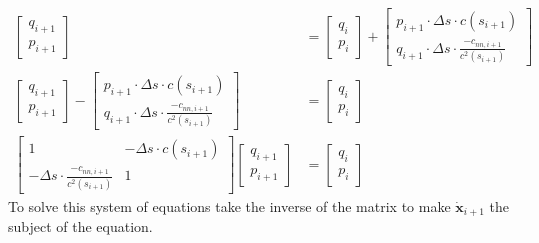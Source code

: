 \documentclass{article}
\begin{document}
\begin{align*}
	\begin{bmatrix} q_{i+1} \\ p_{i+1} \end{bmatrix}                                                                                                                                   & = \begin{bmatrix} q_{i} \\ p_{i} \end{bmatrix} + \begin{bmatrix} p_{i+1}\cdot\Delta s\cdot c(s_{i+1}) \\ q_{i+1}\cdot\Delta s\cdot\frac{-c_{nn,i+1}}{c^2(s_{i+1})} \end{bmatrix}              \\
	\begin{bmatrix} q_{i+1} \\ p_{i+1} \end{bmatrix} - \begin{bmatrix} p_{i+1}\cdot\Delta s\cdot c(s_{i+1}) \\ q_{i+1}\cdot\Delta s\cdot\frac{-c_{nn,i+1}}{c^2(s_{i+1})} \end{bmatrix} & = \begin{bmatrix} q_{i} \\ p_{i} \end{bmatrix}                                                                                                                                                \\
	\begin{bmatrix} 1 & -\Delta s\cdot c(s_{i+1}) \\ -\Delta s\cdot\frac{-c_{nn,i+1}}{c^2(s_{i+1})} & 1 \end{bmatrix} \begin{bmatrix}q_{i+1} \\ p_{i+1} \end{bmatrix}                  & = \begin{bmatrix} q_i \\ p_i \end{bmatrix}
\end{align*}
To solve this system of equations take the inverse of the matrix to make $\dot{\bm{x}}_{i+1}$ the subject of the equation.
\end{document}
